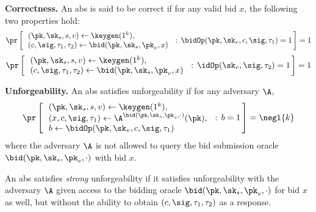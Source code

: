 \begin{description}
\item \textbf{Correctness.} An \gls{abs} is said to be correct if for any valid bid $x$, the following two properties hold:
  \begin{equation*}
      \pr\left[\,\begin{array}{l}
      (\pk,\sk_s, s, v) \gets \keygen(1^k),\\
      (c, \sig,\tau_1, \tau_2) \gets \bid(\pk,\sk_s,\pk_v, x)
    \end{array}\,: \, \bidOp(\pk,\sk_v,c,\sig,\tau_1)=1 \,\right] = 1
  \end{equation*}
  \begin{equation*}
      \pr\left[\,\begin{array}{l}
      (\pk,\sk_s, s, v) \gets \keygen(1^k),\\
      (c, \sig,\tau_1, \tau_2) \gets \bid(\pk,\sk_s,\pk_v, x)
    \end{array}\,: \, \idOp(\sk_v,\sig,\tau_2)=1 \,\right] = 1
  \end{equation*}

\item \textbf{Unforgeability.} An \gls{abs} satisfies unforgeability if for any \ppt adversary $\A$,
\begin{equation*}
    \pr\left[\,\begin{array}{l}
      (\pk,\sk_s, s, v) \gets \keygen(1^k),\\
      (x,c,\sig,\tau_1) \gets \A^{\bid(\pk,\sk_s,\pk_v,\cdot)}(\pk),\\
      b \gets \bidOp(\pk,\sk_v,c,\sig,\tau_1)
    \end{array}\,: \, b=1 \,\right] = \negl{k}
\end{equation*}
where the adversary $\A$ is not allowed to query the bid submission oracle $\bid(\pk, \sk_s, \pk_v,\cdot)$ with bid $x$.

An \gls{abs} satisfies \textit{strong} unforgeability if it satisfies unforgeability with the adversary $\A$ given access to the bidding oracle $\bid(\pk, \sk_s, \pk_v,\cdot)$ for bid $x$ as well, but without the ability to obtain $(c,\sig,\tau_1, \tau_2)$ as a response.


\end{description}
